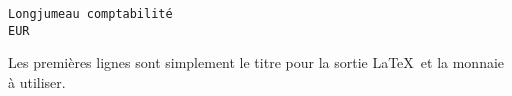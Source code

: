 \linenumbers
\footnotesize
\begin{verbatim}
Longjumeau comptabilité
EUR
\end{verbatim}
\nolinenumbers

Les premières lignes sont simplement le titre pour la sortie \LaTeX\
et la monnaie à utiliser.
